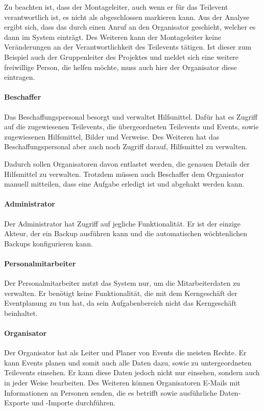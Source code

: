 Zu beachten ist, dass der Montageleiter, auch wenn er für das Teilevent verantwortlich ist, es nicht als abgeschlossen markieren kann. Aus der Analyse ergibt sich, dass das durch einen Anruf an den Organisator geschieht, welcher es dann im System einträgt. Des Weiteren kann der Montageleiter keine Veränderungen an der Verantwortlichkeit des Teilevents tätigen. Ist dieser zum Beispiel auch der Gruppenleiter des Projektes und meldet sich eine weitere freiwillige Person, die helfen möchte, muss auch hier der Organisator diese eintragen.

\paragraph{Beschaffer}
Das Beschaffungspersonal besorgt und verwaltet Hilfsmittel. Dafür hat es Zugriff auf die zugewiesenen Teilevents, die übergeordneten Teilevents und Events, sowie zugewiesenen Hilfsmittel, Bilder und Verweise. Des Weiteren hat das Beschaffungspersonal aber auch noch Zugriff darauf, Hilfsmittel zu verwalten. 

Dadurch sollen Organisatoren davon entlastet werden, die genauen Details der Hilfsmittel zu verwalten. Trotzdem müssen auch Beschaffer dem Organisator manuell mitteilen, dass eine Aufgabe erledigt ist und abgehakt werden kann.

\paragraph{Administrator}
Der Administrator hat Zugriff auf jegliche Funktionalität. Er ist der einzige Akteur, der ein Backup ausführen kann und die automatischen wöchtenlichen Backups konfigurieren kann.

\paragraph{Personalmitarbeiter}
Der Personalmitarbeiter nutzt das System nur, um die Mitarbeiterdaten zu verwalten. Er benötigt keine Funktionalität, die mit dem Kerngeschäft der Eventplanung zu tun hat, da sein Aufgabenbereich nicht das Kerngeschäft beinhaltet.

\paragraph{Organisator}
Der Organisator hat als Leiter und Planer von Events die meisten Rechte. Er kann Events planen und somit auch alle Daten dazu, sowie zu untergeordneten Teilevents einsehen. Er kann diese Daten jedoch nicht nur einsehen, sondern auch in jeder Weise bearbeiten. Des Weiteren können Organisatoren E-Mails mit Informationen an Personen senden, die es betrifft sowie ausführliche Daten-Exporte und -Importe durchführen.


